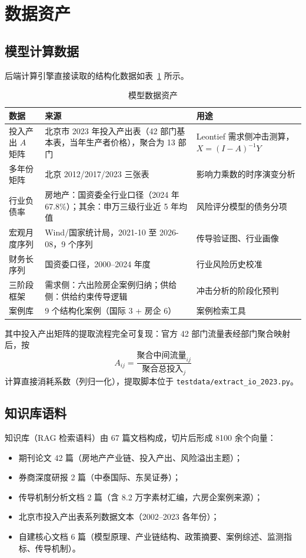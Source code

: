 \documentclass[12pt, a4paper]{ctexart}
\begin{document}
\section{数据资产}

\subsection{模型计算数据}

后端计算引擎直接读取的结构化数据如表~\ref{tab:modeldata} 所示。

\begin{table}[htbp]
\centering
\caption{模型数据资产}
\label{tab:modeldata}
\small
\begin{tabular}{@{}p{3.2cm}p{3.8cm}p{6.5cm}@{}}
\toprule
数据 & 来源 & 用途 \\
\midrule
投入产出 $A$ 矩阵 & 北京市 2023 年投入产出表（42 部门基本表，当年生产者价格），聚合为 13 部门 & Leontief 需求侧冲击测算，$X=(I-A)^{-1}Y$ \\
多年份矩阵 & 北京 2012/2017/2023 三张表 & 影响力乘数的时序演变分析 \\
行业负债率 & 房地产：国资委全行业口径（2024 年 67.8\%）；其余：申万三级行业近 5 年均值 & 风险评分模型的债务分项 \\
宏观月度序列 & Wind/国家统计局，2021-10 至 2026-08，9 个序列 & 传导验证图、行业画像 \\
财务长序列 & 国资委口径，2000--2024 年度 & 行业风险历史校准 \\
三阶段框架 & 需求侧：六出险房企案例归纳；供给侧：供给约束传导逻辑 & 冲击分析的阶段化预判 \\
案例库 & 9 个结构化案例（国际 3 + 房企 6） & 案例检索工具 \\
\bottomrule
\end{tabular}
\end{table}

其中投入产出矩阵的提取流程完全可复现：官方 42 部门流量表经部门聚合映射后，按
\[
A_{ij} = \frac{\text{聚合中间流量}_{ij}}{\text{聚合总投入}_j}
\]
计算直接消耗系数（列归一化），提取脚本位于 \texttt{testdata/extract\_io\_2023.py}。

\subsection{知识库语料}

知识库（RAG 检索语料）由 67 篇文档构成，切片后形成 8100 余个向量：

\begin{itemize}[nosep]
  \item 期刊论文 42 篇（房地产产业链、投入产出、风险溢出主题）；
  \item 券商深度研报 2 篇（中泰国际、东吴证券）；
  \item 传导机制分析文档 2 篇（含 8.2 万字素材汇编，六房企案例来源）；
  \item 北京市投入产出表系列数据文本（2002--2023 各年份）；
  \item 自建核心文档 6 篇（模型原理、产业链结构、政策摘要、案例综述、监测指标、传导机制）。
\end{itemize}
\end{document}
